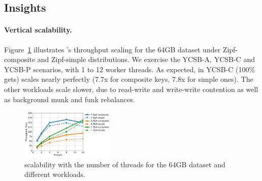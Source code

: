 
\subsection{Insights}
\label{ssec:drill} 

\paragraph{Vertical scalability.} 
Figure~\ref{fig:scalability} illustrates \sys's throughput scaling for the 64GB dataset under Zipf-composite and Zipf-simple  
distributions. We exercise the YCSB-A, YCSB-C and YCSB-P scenarios, with 1 to 12 worker threads.  
As expected, in YCSB-C (100\% gets) \sys\/ scales nearly perfectly (7.7x for composite keys, 7.8x for simple ones). 
The other workloads scale slower, due to read-write and write-write contention as well as background munk and funk rebalances. 

\begin{figure}[th]
\centering
\includegraphics[width=0.4\textwidth]{figs/scalability_line.pdf}

\caption{{\sys\/ scalability with the number of threads for 
the 64GB dataset and different workloads. }}
\label{fig:scalability}
\end{figure}

